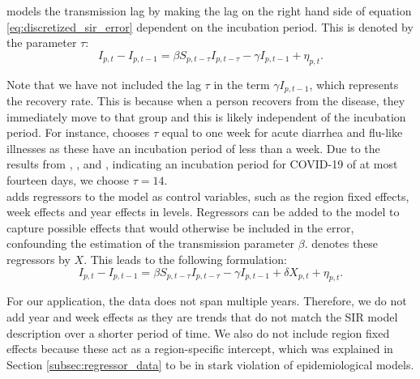 \documentclass[12pt]{article}
\begin{document}
	\textcite{adda2016economic} models the transmission lag by making the lag on the right hand side of equation \eqref{eq:discretized_sir_error} dependent on the incubation period. This is denoted by the parameter $\tau$:
	    \begin{equation}\label{eq:discretized_sir_tau}
	        I_{p,t} - I_{p,t-1} = \beta S_{p,t-\tau}I_{p,t-\tau} - \gamma I_{p,t-1} + \eta_{p,t}.
	    \end{equation}
	
	Note that we have not included the lag $\tau$ in the term $\gamma I_{p,t-1}$, which represents the recovery rate. This is because when a person recovers from the disease, they immediately move to that group and this is likely independent of the incubation period. For instance, \textcite{adda2016economic} chooses $\tau$ equal to one week for acute diarrhea and flu-like illnesses as these have an incubation period of less than a week. Due to the results from \textcite{lauer2020incubation}, \textcite{li2020incubation}, and \textcite{linton2020incubation}, indicating an incubation period for COVID-19 of at most fourteen days, we choose $\tau = 14$. \\
	
	\textcite{adda2016economic} adds regressors to the model as control variables, such as the region fixed effects, week effects and year effects in levels. Regressors can be added to the model to capture possible effects that would otherwise be included in the error, confounding the estimation of the transmission parameter $\beta$. \textcite{adda2016economic} denotes these regressors by $X$. This leads to the following formulation:
	    \begin{equation}\label{eq:discretized_sir_regressors}
        	I_{p,t} - I_{p,t-1} = \beta S_{p,t-\tau}I_{p,t-\tau} - \gamma I_{p,t-1} + \delta X_{p,t} + \eta_{p,t}.
    	\end{equation}
    	
	For our application, the data does not span multiple years. Therefore, we do not add year and week effects as they are trends that do not match the SIR model description over a shorter period of time. We also do not include region fixed effects because these act as a region-specific intercept, which was explained in Section \ref{subsec:regressor_data} to be in stark violation of epidemiological models.
	\\
	
\end{document}
